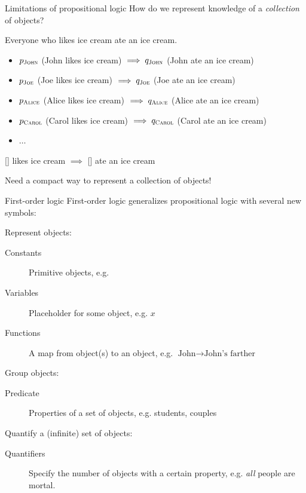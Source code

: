 \documentclass[usenames,dvipsnames,notes]{beamer}
\begin{document}
\begin{frame}
    {Limitations of propositional logic}
    How do we represent knowledge of a \emph{collection} of objects?

    Everyone who likes ice cream ate an ice cream.\\
    \begin{itemize}
        \item[] $p_{\textsc{John}}$ (John likes ice cream) $\implies q_{\textsc{John}}$ (John ate an ice cream)
        \item[] $p_{\textsc{Joe}}$ (Joe likes ice cream) $\implies q_{\textsc{Joe}}$ (Joe ate an ice cream)
        \item[] $p_{\textsc{Alice}}$ (Alice likes ice cream) $\implies q_{\textsc{Alice}}$ (Alice ate an ice cream)
        \item[] $p_{\textsc{Carol}}$ (Carol likes ice cream) $\implies q_{\textsc{Carol}}$ (Carol ate an ice cream)
        \item[] $\ldots$
    \end{itemize}

    [\hspace{2em}] likes ice cream $\implies$ [\hspace{2em}] ate an ice cream

    Need a compact way to represent a collection of objects!
\end{frame}

\begin{frame}
    {First-order logic}
    First-order logic generalizes propositional logic with several new symbols:

    Represent objects:\\
            \begin{description}
                \item[Constants] Primitive objects, e.g. 
                \item[Variables] Placeholder for some object, e.g. $x$
                \item[Functions] A map from object(s) to an object, e.g. $\text{John} \rightarrow \text{John's farther}$
            \end{description}

    Group objects:\\
    \begin{description}
        \item[Predicate] Properties of a set of objects, e.g. students, couples
    \end{description}

    Quantify a (infinite) set of objects:\\
    \begin{description}
        \item[Quantifiers] Specify the number of objects with a certain property, e.g. \emph{all} people are mortal.
    \end{description}
\end{frame}
\end{document}
